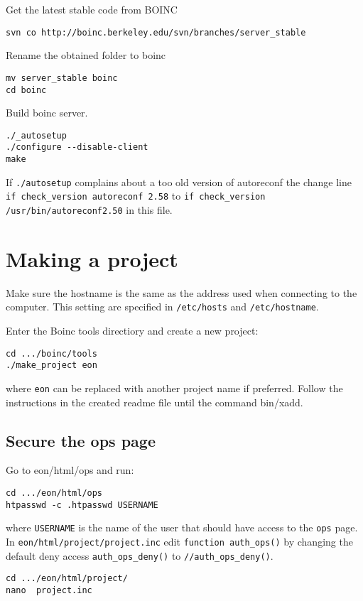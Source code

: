 \documentclass{article}
\begin{document}
Get the latest stable code from BOINC
\begin{verbatim}
svn co http://boinc.berkeley.edu/svn/branches/server_stable
\end{verbatim}
%
Rename the obtained folder to boinc
\begin{verbatim}
mv server_stable boinc
cd boinc
\end{verbatim}
%
Build boinc server. 
\begin{verbatim}
./_autosetup   
./configure --disable-client
make 
\end{verbatim}
%
If \texttt{./autosetup} complains about a too old version of autoreconf the change line \texttt{if check\_version autoreconf 2.58} to \texttt{if check\_version /usr/bin/autoreconf2.50} in this file.
%
\section{Making a project}
Make sure the hostname is the same as the address used when connecting to the computer. This setting are specified in \texttt{/etc/hosts} and \texttt{/etc/hostname}.

Enter the Boinc tools directiory and create a new project:
\begin{verbatim}
cd .../boinc/tools
./make_project eon 
\end{verbatim}
where \texttt{eon} can be replaced with another project name if preferred.  
Follow the instructions in the created readme file until the command bin/xadd.

\subsection{Secure the ops page}
Go to eon/html/ops and run:
\begin{verbatim}
cd .../eon/html/ops
htpasswd -c .htpasswd USERNAME
\end{verbatim}
where \texttt{USERNAME} is the name of the user that should have access to the \texttt{ops} page.  
In \texttt{eon/html/project/project.inc} edit \texttt{function auth\_ops()} by changing the default deny access \texttt{auth\_ops\_deny()} to \texttt{//auth\_ops\_deny()}.
\begin{verbatim}
cd .../eon/html/project/
nano  project.inc
\end{verbatim}
\end{document}
